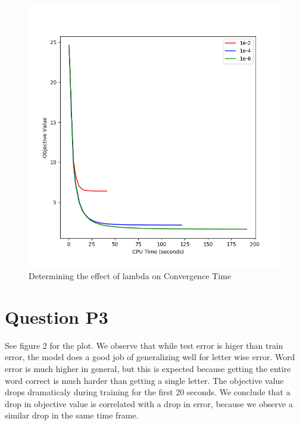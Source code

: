 \documentclass[11pt]{report}
\begin{document}
\begin{figure}[b]
\centering
\includegraphics[scale=0.4]{p2_figure.png}
\caption{Determining the effect of lambda on Convergence Time}
\end{figure}
\section*{Question P3}
See figure 2 for the plot. We observe that while test error is
higer than train error, the model does a good job of generalizing
well for letter wise error. Word error is much higher in general,
but this is expected because getting the entire word correct is
much harder than getting a single letter. The objective value 
drops dramaticaly during training for the first 20 seconds. We
conclude that a drop in objective value is correlated with a drop
in error, because we observe a similar drop in the same time frame.
\end{document}
